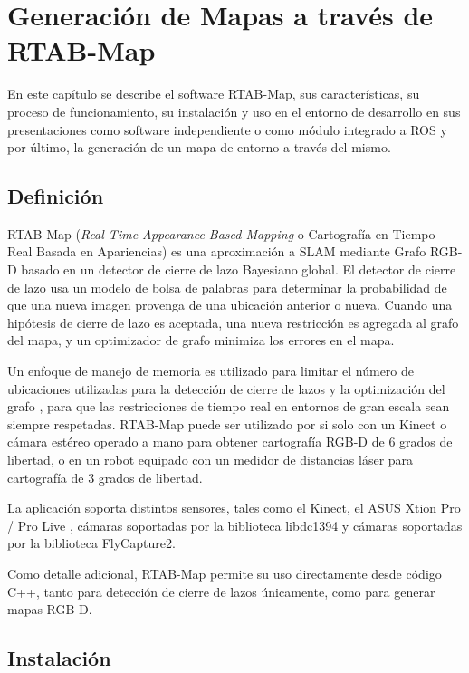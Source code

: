 \chapter{Generación de Mapas a través de RTAB-Map}

En este capítulo se describe el software RTAB-Map, sus características, su proceso de funcionamiento, su instalación y uso en el entorno de desarrollo en sus presentaciones como software independiente o como módulo integrado a ROS y por último, la generación de un mapa de entorno a través del mismo.

\section{Definición}

RTAB-Map (\textit{Real-Time Appearance-Based Mapping} o Cartografía en Tiempo Real Basada en Apariencias) es una aproximación a SLAM mediante Grafo RGB-D basado en un detector de cierre de lazo Bayesiano global. El detector de cierre de lazo usa un modelo de bolsa de palabras para determinar la probabilidad de que una nueva imagen provenga de una ubicación anterior o nueva. Cuando una hipótesis de cierre de lazo es aceptada, una nueva restricción es agregada al grafo del mapa, y un optimizador de grafo minimiza los errores en el mapa. \cite{labbe14online}

Un enfoque de manejo de memoria es utilizado para limitar el número de ubicaciones utilizadas para la detección de cierre de lazos y la optimización del grafo \cite{labbe13appearance}, para que las restricciones de tiempo real en entornos de gran escala sean siempre respetadas. RTAB-Map puede ser utilizado por si solo con un Kinect o cámara estéreo operado a mano para obtener cartografía RGB-D de 6 grados de libertad, o en un robot equipado con un medidor de distancias láser para cartografía de 3 grados de libertad. \cite{rtabmaphome}

La aplicación soporta distintos sensores, tales como el Kinect, el ASUS Xtion Pro / Pro Live \cite{xtionpro} \cite{xtionprolive}, cámaras soportadas por la biblioteca libdc1394 \cite{libdc1394} y cámaras soportadas por la biblioteca FlyCapture2. \cite{libflycapture2}

Como detalle adicional, RTAB-Map permite su uso directamente desde código C++, tanto para detección de cierre de lazos únicamente, como para generar mapas RGB-D.

\section{Instalación}

